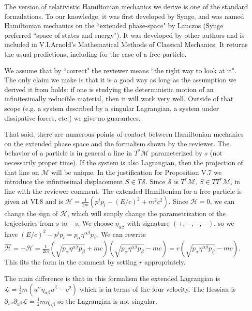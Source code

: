 \documentclass[10pt]{article}
\begin{document}
The version of relativistic Hamiltonian mechanics we derive is one of the standard formulations. To our knowledge, it was first developed by Synge, and was named Hamiltonian mechanics on the ``extended phase-space" by Lanczos (Synge preferred ``space of states and energy"). It was developed by other authors and is included in V.I.Arnold's Mathematical Methods of Classical Mechanics. It returns the usual predictions, including for the case of a free particle.

We assume that by ``correct" the reviewer means ``the right way to look at it". The only claim we make is that it is a good way as long as the assumption we derived it from holds: if one is studying the deterministic motion of an infinitesimally reducible material, then it will work very well. Outside of that scope (e.g. a system described by a singular Lagrangian, a system under dissipative forces, etc.) we give no guarantees.

That said, there are numerous points of contact between Hamiltonian mechanics on the extended phase space and the formalism shown by the reviewer. The behavior of a particle is in general a line in $T^*\mathcal{M}$ parameterized by $s$ (not necessarily proper time). If the system is also Lagrangian, then the projection of that line on $\mathcal{M}$ will be unique. In the justification for Proposition V.7 we introduce the infinitesimal displacement $S \in T\mathcal{S}$. Since $\mathcal{S}$ is $T^*\mathcal{M}$, $S \in TT^*\mathcal{M}$, in line with the reviewer comment. The extended Hamiltonian for a free particle is given at VI.8 and is $\mathcal{H} = \frac{1}{2m} ( p^i p_i - (E/c)^2 + m^2c^2)$. Since $\mathcal{H}=0$, we can change the sign of $\mathcal{H}$, which will simply change the parametrization of the trajectories from $s$ to $-s$. We choose $\eta_{\alpha \beta}$ with signature $(+,-,-,-)$, so we have $(E/c)^2 - p^i p_i = p_\alpha \eta^{\alpha \beta} p_\beta$. We can rewrite $\hat{\mathcal{H}} = -\mathcal{H} = \frac{1}{2m} (\sqrt{p_\alpha \eta^{\alpha \beta} p_\beta} + mc) ( \sqrt{p_\alpha \eta^{\alpha \beta} p_\beta} - mc) = r ( \sqrt{p_\alpha \eta^{\alpha \beta} p_\beta} - mc)$. This fits the form in the comment by setting $r$ appropriately.

The main difference is that in this formalism the extended Lagrangian is $\mathcal{L}=\frac{1}{2} m(u^\alpha \eta_{\alpha \beta} u^\beta - c^2)$ which is in terms of the four velocity. The Hessian is $\partial_{u^\alpha}\partial_{u^\beta} \mathcal{L} = \frac{1}{2}m \eta_{\alpha \beta}$ so the Lagrangian is not singular.
\end{document}

